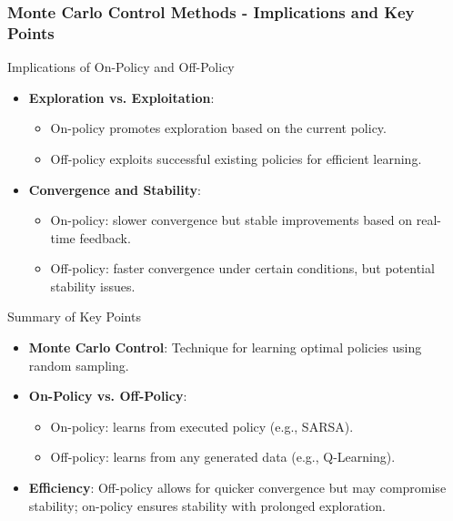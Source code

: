 \documentclass[aspectratio=169]{beamer}
\begin{document}
\begin{frame}[fragile]
    \frametitle{Monte Carlo Control Methods - Implications and Key Points}
    \begin{block}{Implications of On-Policy and Off-Policy}
        \begin{itemize}
            \item \textbf{Exploration vs. Exploitation}:
                \begin{itemize}
                    \item On-policy promotes exploration based on the current policy.
                    \item Off-policy exploits successful existing policies for efficient learning.
                \end{itemize}
            \item \textbf{Convergence and Stability}:
                \begin{itemize}
                    \item On-policy: slower convergence but stable improvements based on real-time feedback.
                    \item Off-policy: faster convergence under certain conditions, but potential stability issues.
                \end{itemize}
        \end{itemize}
    \end{block}

    \begin{block}{Summary of Key Points}
        \begin{itemize}
            \item \textbf{Monte Carlo Control}: Technique for learning optimal policies using random sampling.
            \item \textbf{On-Policy vs. Off-Policy}:
                \begin{itemize}
                    \item On-policy: learns from executed policy (e.g., SARSA).
                    \item Off-policy: learns from any generated data (e.g., Q-Learning).
                \end{itemize}
            \item \textbf{Efficiency}: Off-policy allows for quicker convergence but may compromise stability; on-policy ensures stability with prolonged exploration.
        \end{itemize}
    \end{block}
\end{frame}
\end{document}
